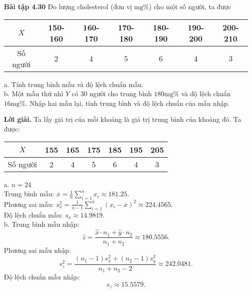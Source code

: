 \documentclass[12pt,a4paper]{article}
\begin{document}
\begin{mybox}
\textbf{Bài tập 4.30} Đo lượng cholesterol (đơn vị $\mathrm{mg}\%$) cho một số người, ta được
\begin{table}[H]
\begin{tabular}{|c|c|c|c|c|c|c|}
\hline 
$X$ & 150-160 & 160-170 & 170-180 & 180-190 & 190-200 & 200-210 \\ 
\hline 
Số người & 2 & 4 & 5 & 6 & 4 & 3 \\ 
\hline 
\end{tabular} 
\end{table}
a. Tính trung bình mẫu và độ lệch chuẩn mẫu.\\
b. Một mẫu thứ nhì $Y$ có $30$ người cho trung bình $180 \mathrm{mg}\%$ và độ lệch chuẩn $16 \mathrm{mg}\%.$ Nhập hai mẫu lại, tính trung bình và độ lệch chuẩn của mẫu nhập.
\end{mybox}
\textbf{Lời giải.} Ta lấy giá trị của mỗi khoảng là giá trị trung bình của khoảng đó. Ta được:
\begin{table}[H]
\begin{tabular}{|c|c|c|c|c|c|c|}
\hline 
$X$ & 155 & 165 & 175 & 185 & 195 & 205 \\ 
\hline 
Số người & 2 & 4 & 5 & 6 & 4 & 3 \\ 
\hline 
\end{tabular} 
\end{table}
a. $n = 24$\\
Trung bình mẫu:
$\overline x  = \frac{1}{n}\sum\limits_{i = 1}^n {{x_i}}  \approx 181.25.$\\
Phương sai mẫu: $s_x^2 = \frac{1}{{n - 1}}\sum\limits_{i = 1}^n {{{\left( {{x_i} - \overline x } \right)}^2}}  \approx 224.4565.$\\
Độ lệch chuẩn mẫu: ${s_x} \approx 14.9819.$\\
b. Trung bình mẫu nhập:
$$\widehat{z} = \frac{\widehat{x} \cdot n_1 + \widehat{y} \cdot n_2}{n_1 + n_2} \approx 180.5556.$$
Phương sai mẫu nhập:
$$s_z^2 = \frac{\left( {n_1 - 1} \right )s_x^2 + \left( {n_2 - 1} \right )s_y^2}{n_1 + n_2 - 2} \approx 242.0481.$$
Độ lệch chuẩn mẫu nhập:
$$s_z \approx 15.5579.$$
\end{document}
